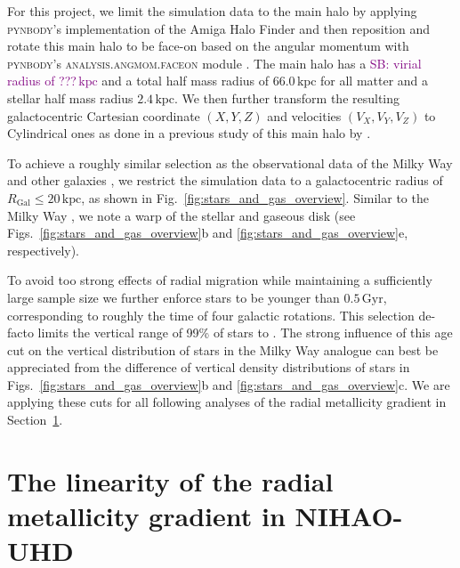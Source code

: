 \documentclass[fleqn,usenatbib]{mnras}
\newcommand{\SB}[1]{{\textcolor{purple}{SB: #1}}}
\newcommand{\nihaoAGEmax}{$0.5\,\mathrm{Gyr}$}
\begin{document}
For this project, we limit the simulation data to the main halo by applying \textsc{pynbody}'s implementation of the Amiga Halo Finder \citep{Knollman2009} and then reposition and rotate this main halo to be face-on based on the angular momentum with \textsc{pynbody}'s \textsc{analysis.angmom.faceon} module \citep{pynbody}. The main halo has a \SB{virial radius of ???$\,\mathrm{kpc}$} and a total half mass radius of $66.0\,\mathrm{kpc}$ for all matter and a stellar half mass radius $2.4\,\mathrm{kpc}$. We then further transform the resulting galactocentric Cartesian coordinate $(X,Y,Z)$ and velocities $(V_X,V_Y,V_Z)$ to Cylindrical ones as done in a previous study of this main halo by \citet{Buder2024}.

To achieve a roughly similar selection as the observational data of the Milky Way \citep{Genovali2014} and other galaxies \citep[e.g.][]{Chen2023}, we restrict the simulation data to a galactocentric radius of $R_\mathrm{Gal} \leq 20\,\mathrm{kpc}$, as shown in Fig.~\ref{fig:stars_and_gas_overview}. Similar to the Milky Way \citep{Poggio2018, Lemasle2022}, we note a warp of the stellar and gaseous disk (see Figs.~\ref{fig:stars_and_gas_overview}b and \ref{fig:stars_and_gas_overview}e, respectively).

To avoid too strong effects of radial migration \citep{Binney2008, Frankel2018, Grand2016} while maintaining a sufficiently large sample size we further enforce stars to be younger than \nihaoAGEmax, corresponding to roughly the time of four galactic rotations. This selection de-facto limits the vertical range of 99\% of stars to . The strong influence of this age cut on the vertical distribution of stars in the Milky Way analogue can best be appreciated from the difference of vertical density distributions of stars in Figs.~\ref{fig:stars_and_gas_overview}b and \ref{fig:stars_and_gas_overview}c. We are applying these cuts for all following analyses of the radial metallicity gradient in Section~\ref{sec:linear_radial_metallicity_gradients}.

\section{The linearity of the radial metallicity gradient in NIHAO-UHD}
\label{sec:linear_radial_metallicity_gradients}
\end{document}
